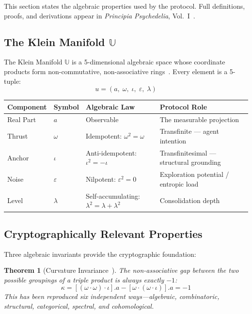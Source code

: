 \documentclass[12pt,a4paper]{article}
\newtheorem{theorem}{Theorem}[section]
\begin{document}
This section states the algebraic properties used by the protocol. Full definitions, proofs, and derivations appear in \emph{Principia Psychedelia}, Vol.~I~\cite{PP-I-Ch1,PP-I-Ch5}.

\subsection{The Klein Manifold $\mathbb{U}$}

The Klein Manifold $\mathbb{U}$ is a 5-dimensional algebraic space whose coordinate products form non-commutative, non-associative rings~\cite{PP-I-Ch1}. Every element is a 5-tuple:
\begin{equation}
u = (a,\; \omega,\; \iota,\; \varepsilon,\; \lambda)
\end{equation}

\begin{center}
\small
\begin{tabular}{@{}lllp{6.5cm}@{}}
\toprule
\textbf{Component} & \textbf{Symbol} & \textbf{Algebraic Law} & \textbf{Protocol Role} \\
\midrule
Real Part   & $a$            & Observable             & The measurable projection \\
Thrust      & $\omega$       & Idempotent: $\omega^2 = \omega$ & Transfinite --- agent intention \\
Anchor      & $\iota$        & Anti-idempotent: $\iota^2 = -\iota$ & Transfinitesimal --- structural grounding \\
Noise       & $\varepsilon$  & Nilpotent: $\varepsilon^2 = 0$   & Exploration potential / entropic load \\
Level       & $\lambda$      & Self-accumulating: $\lambda^2 = \lambda + \lambda^2$ & Consolidation depth \\
\bottomrule
\end{tabular}
\end{center}

\subsection{Cryptographically Relevant Properties}

Three algebraic invariants provide the cryptographic foundation:

\begin{theorem}[Curvature Invariance~{\cite[Ch.~1, Thm.~1.1]{PP-I-Ch1}}]
\label{thm:curvature}
The non-associative gap between the two possible groupings of a triple product is always exactly $-1$:
\begin{equation}
\kappa = [(\omega \cdot \omega) \cdot \iota].a - [\omega \cdot (\omega \cdot \iota)].a = -1
\end{equation}
This has been reproduced six independent ways---algebraic, combinatoric, structural, categorical, spectral, and cohomological.
\end{theorem}
\end{document}

